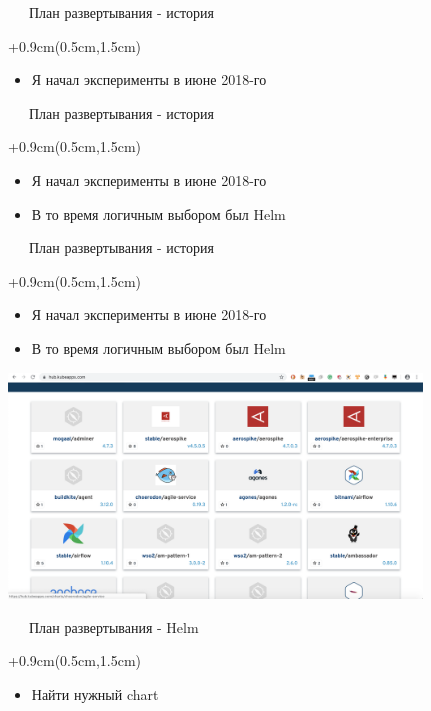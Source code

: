 \documentclass[xetex,18pt,aspectratio=43]{beamer}
\begin{document}
\begin{Large}
\begin{frame}{\ \ \ План развертывания - история}
\begin{textblock*}{\framewidth+0.9cm}(0.5cm,1.5cm)
\begin{itemize}
  \item Я начал эксперименты в июне 2018-го
\end{itemize}
\end{textblock*}
\end{frame}

\begin{frame}{\ \ \ План развертывания - история}
\begin{textblock*}{\framewidth+0.9cm}(0.5cm,1.5cm)
\begin{itemize}
  \item Я начал эксперименты в июне 2018-го
  \item В то время логичным выбором был Helm
\end{itemize}
\end{textblock*}
\end{frame}

\begin{frame}{\ \ \ План развертывания - история}
\begin{textblock*}{\framewidth+0.9cm}(0.5cm,1.5cm)
\begin{itemize}
  \item Я начал эксперименты в июне 2018-го
  \item В то время логичным выбором был Helm
\end{itemize}
\begin{minipage}{\textwidth}
  \centering
  \includegraphics[height=6.0cm]{img/kubeapps}
\end{minipage}
\end{textblock*}
\end{frame}

\begin{frame}{\ \ \ План развертывания - Helm}
\begin{textblock*}{\framewidth+0.9cm}(0.5cm,1.5cm)
\begin{itemize}
  \item Найти нужный chart
\end{itemize}
\end{textblock*}
\end{frame}


\end{Large}
\end{document}
